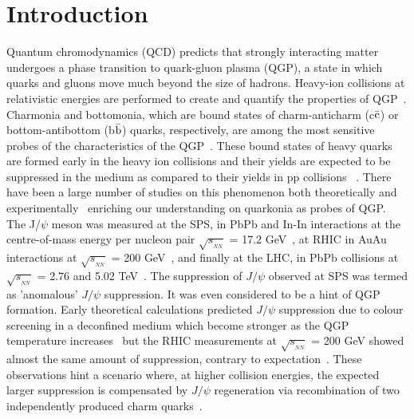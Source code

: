 \documentclass[12pt,a4paper,final]{iopart} %
\newcommand{\Jpsi}{J/\psi}
\newcommand{\sNN}{\sqrt{s_{_{NN}}}}
\begin{document}
\section{Introduction}

Quantum chromodynamics (QCD) predicts that strongly interacting matter undergoes a phase
transition to quark-gluon plasma (QGP), a state in which quarks and gluons move much beyond the
size of hadrons. Heavy-ion collisions at relativistic energies are performed to create and
quantify the properties of QGP~\cite{Busza:2018rrf,Shuryak:2017aol}. Charmonia and bottomonia,
which are bound states of charm-anticharm (c$\bar{\rm c}$) or bottom-antibottom (b$\bar{\rm b}$) quarks,
respectively, are among the most sensitive probes of the characteristics of the QGP~\cite{Brambilla:2010cs}.
These bound states of heavy quarks are formed early in the heavy ion collisions and their
yields are expected to be suppressed in the medium as compared to their yields in pp
collisions ~\cite{Matsui:1986dk,Hashimoto:1986nn}. 
 There have been a large number of studies on this phenomenon both theoretically and 
 experimentally~\cite{Brambilla:2010cs,Schukraft:2013wba,Andronic:2015wma} 
 enriching our understanding on quarkonia as probes of QGP. 
 The J/$\psi$ meson was measured at the SPS, in PbPb and In-In interactions
at the centre-of-mass energy per nucleon pair $\sNN$ = 17.2 GeV~\cite{Alessandro:2004ap,Arnaldi:2007zz},
at RHIC in AuAu interactions at 
$\sNN$ = 200 GeV~\cite{Adare:2011yf,Abelev:2009qaa,Tang:2011kr}, and finally at the LHC,
in PbPb collisions at $\sNN$ = 2.76 and
5.02 TeV~\cite{Aad:2010aa,Chatrchyan:2012np,Khachatryan:2016ypw,Sirunyan:2017isk,ATLAS:2016qpn,Abelev:2013ila,Adam:2016rdg,Acharya:2017tgv}.
The suppression of $\Jpsi$ observed at SPS was termed as 'anomalous' $\Jpsi$
suppression. It was even considered to be a hint of QGP~\cite{Alessandro:2004ap,Arnaldi:2007zz} formation.
Early theoretical calculations predicted $\Jpsi$ suppression due to colour screening
in a deconfined medium which become stronger as the QGP 
temperature increases~\cite{Matsui:1986dk,Digal:2001ue} but the RHIC measurements
at $\sNN$ = 200 GeV showed almost the same amount of suppression, contrary to
expectation~\cite{Brambilla:2010cs,Adare:2011yf}. These observations hint a scenario where,
at higher collision energies, the expected larger suppression is compensated by
$\Jpsi$ regeneration via recombination of two independently produced 
charm quarks~\cite{Andronic:2003zv,Thews:2000rj,Du:2017qkv}. 
\end{document}
